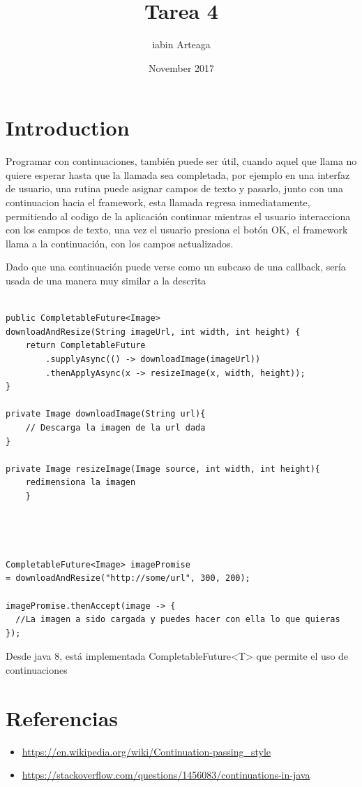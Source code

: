 \documentclass{article}
\title{Tarea 4}
\author{iabin Arteaga}
\date{November 2017}
\begin{document}
\maketitle

\section{Introduction}



Programar con continuaciones, también puede ser útil, cuando aquel que llama no quiere esperar hasta que la llamada sea completada, por ejemplo en una interfaz de usuario, una rutina puede asignar campos de texto y pasarlo, junto con una continuacion hacia el framework, esta llamada regresa inmediatamente, permitiendo al codigo de la aplicación continuar mientras el usuario interacciona con los campos de texto, una vez el usuario presiona el botón OK, el framework llama a la continuación, con los campos actualizados.

Dado que una continuación puede verse como un subcaso de una callback, sería usada de una manera muy similar a la descrita 


\begin{lstlisting}

public CompletableFuture<Image> 
downloadAndResize(String imageUrl, int width, int height) {
    return CompletableFuture
        .supplyAsync(() -> downloadImage(imageUrl))
        .thenApplyAsync(x -> resizeImage(x, width, height));
}

private Image downloadImage(String url){
    // Descarga la imagen de la url dada
}

private Image resizeImage(Image source, int width, int height){
    redimensiona la imagen
    }




CompletableFuture<Image> imagePromise 
= downloadAndResize("http://some/url", 300, 200);

imagePromise.thenAccept(image -> {
  //La imagen a sido cargada y puedes hacer con ella lo que quieras
});
\end{lstlisting}



Desde java 8, está implementada CompletableFuture<T> que permite el uso de continuaciones





\section*{Referencias}
\begin{itemize}
  \item \url{https://en.wikipedia.org/wiki/Continuation-passing_style}
  \item \url{https://stackoverflow.com/questions/1456083/continuations-in-java}
\end{itemize}
\end{document}
